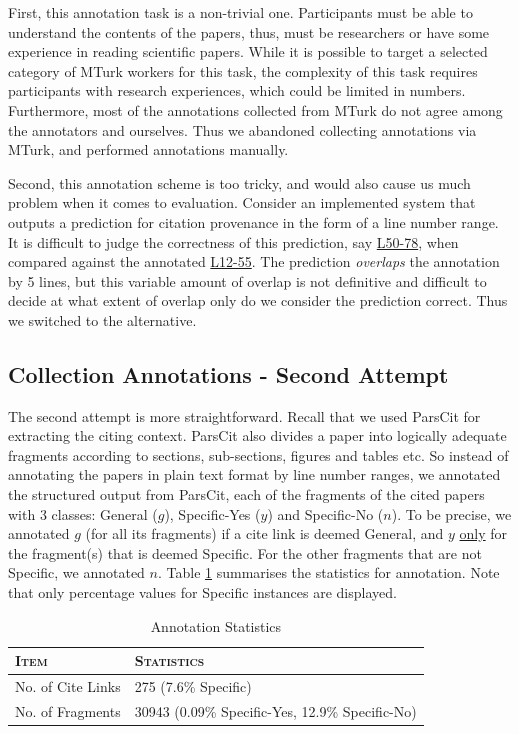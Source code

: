 First, this annotation task is a non-trivial one. Participants must be able to understand the contents of the papers, thus, must be researchers or have some experience in reading scientific papers. While it is possible to target a selected category of MTurk workers for this task, the complexity of this task requires participants with research experiences, which could be limited in numbers. Furthermore, most of the annotations collected from MTurk do not agree among the annotators and ourselves. Thus we abandoned collecting annotations via MTurk, and performed annotations manually.

Second, this annotation scheme is too tricky, and would also cause us much problem when it comes to evaluation. Consider an implemented system that outputs a prediction for citation provenance in the form of a line number range. It is difficult to judge the correctness of this prediction, say \url{L50-78}, when compared against the annotated \url{L12-55}. The prediction \textit{overlaps} the annotation by 5 lines, but this variable amount of overlap is not definitive and difficult to decide at what extent of overlap only do we consider the prediction correct. Thus we switched to the alternative.

\subsection*{Collection Annotations - Second Attempt}
The second attempt is more straightforward. Recall that we used ParsCit for extracting the citing context. ParsCit also divides a paper into logically adequate fragments according to sections, sub-sections, figures and tables etc. So instead of annotating the papers in plain text format by line number ranges, we annotated the structured output from ParsCit, each of the fragments of the cited papers with 3 classes: General ($g$), Specific-Yes ($y$) and Specific-No ($n$). To be precise, we annotated $g$ (for all its fragments) if a cite link is deemed General, and $y$ \underline{only} for the fragment(s) that is deemed Specific. For the other fragments that are not Specific, we annotated $n$. Table \ref{tab:annotation} summarises the statistics for annotation. Note that only percentage values for Specific instances are displayed.

\begin{table}[h]
	\center
	\begin{tabular}{ l | l}
		\textsc{Item} & \textsc{Statistics}\\
		\hline
		No. of Cite Links & 275 (7.6\% Specific) \\
		No. of Fragments & 30943 (0.09\% Specific-Yes, 12.9\% Specific-No)
	\end{tabular}
	\caption{Annotation Statistics}
	\label{tab:annotation}
\end{table}

